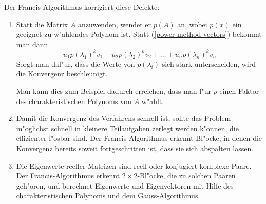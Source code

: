 Der Francis-Algorithmus korrigiert diese Defekte:
\begin{enumerate}
\item
Statt die Matrix $A$ anzuwenden, wendet er $p(A)$ an, wobei
$p(x)$ ein geeignet zu w"ahlendes Polynom ist.
Statt (\ref{power-method-vectors}) bekommt man dann
\[
u_1p(\lambda_1)^kv_1+u_2p(\lambda_2)^kv_2+\dots+u_np(\lambda_n)^kv_n
\]
Sorgt man daf"ur, dass die Werte von $p(\lambda_i)$ sich stark
unterscheiden, wird die Konvergenz beschleunigt.

Man kann dies zum
Beispiel dadurch erreichen, dass man f"ur $p$ einen Faktor des
charakteristischen Polynoms von $A$ w"ahlt.
\item 
Damit die Konvergenz des Verfahrens schnell ist, sollte das Problem
m"oglichst schnell in kleinere Teilaufgaben zerlegt werden k"onnen,
die effizienter l"osbar sind.
Der Francis-Algorithmus erkennt 
Bl"ocke, in denen die Konvergenz bereits soweit fortgeschritten
ist, dass sie sich abspalten lassen.
\item
Die Eigenwerte reeller Matrizen sind reell oder konjugiert komplexe
Paare.
Der Francis-Algorithmus erkennt $2\times 2$-Bl"ocke, die zu
solchen Paaren geh"oren, und berechnet Eigenwerte und Eigenvektoren
mit Hilfe des charakteristischen Polynoms und dem Gauss-Algorithmus.
\end{enumerate}
